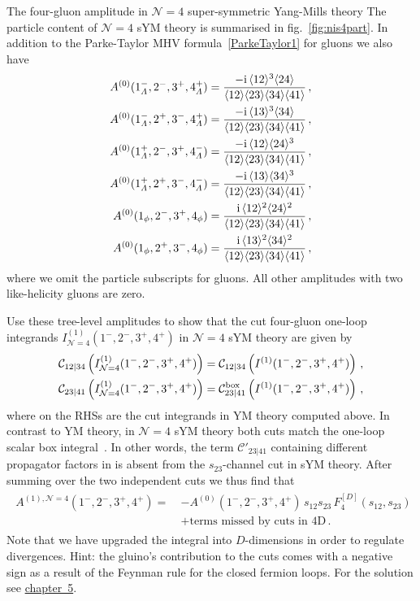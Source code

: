 \begin{exer}{The four-gluon amplitude in $\mathcal{N}=4$ super-symmetric Yang-Mills theory}
The particle content of $\mathcal{N}=4$ sYM theory is summarised in fig.~\ref{fig:nis4part}.
In addition to the Parke-Taylor MHV formula~\eqref{ParkeTaylor1} for gluons we also have
\begin{align}
\begin{aligned}
  A^{(0)}(1_\Lambda^-,2^-,3^+,4_\Lambda^+) &= \frac{-\i \, \spA12^3 \spA24}{\spA12\spA23\spA34\spA41} \,, \\
  A^{(0)}(1_\Lambda^-,2^+,3^-,4_\Lambda^+) &= \frac{-\i \, \spA13^3 \spA34}{\spA12\spA23\spA34\spA41} \,, \\
  A^{(0)}(1_\Lambda^+,2^-,3^+,4_\Lambda^-) &= \frac{-\i \, \spA12 \spA24^3}{\spA12\spA23\spA34\spA41} \,, \\
  A^{(0)}(1_\Lambda^+,2^+,3^-,4_\Lambda^-) &= \frac{-\i \, \spA13 \spA34^3}{\spA12\spA23\spA34\spA41} \,, \\
  A^{(0)}(1_\phi,2^-,3^+,4_\phi) &= \frac{\i \, \spA12^2\spA24^2}{\spA12\spA23\spA34\spA41} \,, \\
  A^{(0)}(1_\phi,2^+,3^-,4_\phi) &= \frac{\i \, \spA13^2\spA34^2}{\spA12\spA23\spA34\spA41} \,,
\end{aligned}
\end{align}
where we omit the particle subscripts for gluons.
All other amplitudes with two like-helicity gluons are zero.

Use these tree-level amplitudes to show that the cut four-gluon one-loop integrands $I^{(1)}_{\mathcal{N}=4}(1^-,2^-,3^+,4^+)$ in $\mathcal{N}=4$ sYM theory are given by
\begin{align}
  \mathcal{C}_{12|34}\left( I^{(1)}_{\mathcal{N}=4}(1^-,2^-,3^+,4^+) \right) &= \mathcal{C}_{12|34}\left( I^{(1)}(1^-,2^-,3^+,4^+) \right) \,, \\
  \mathcal{C}_{23|41}\left( I^{(1)}_{\mathcal{N}=4}(1^-,2^-,3^+,4^+) \right) &= \mathcal{C}_{23|41}^{\rm box}\left( I^{(1)}(1^-,2^-,3^+,4^+) \right) \,,
\end{align}
where on the RHSs are the cut integrands in YM theory computed above.
In contrast to YM theory, in $\mathcal{N}=4$ sYM theory both cuts match the one-loop scalar box integral~\cite{ch3_Bern:1994zx}. In other words, the term $\mathcal{C}'_{23|41}$ containing different propagator factors in  is absent from the $s_{23}$-channel cut in sYM theory. After summing over the two independent cuts we thus find that
\begin{align}
\begin{aligned}
  A^{(1),\mathcal{N}=4}(1^-,2^-,3^+,4^+) = \ & - A^{(0)}(1^-,2^-,3^+,4^+) \, s_{12} s_{23} \, F^{[D]}_4(s_{12},s_{23}) \\ &+ \text{terms missed by cuts in 4D} \,.
\end{aligned}
\end{align}
Note that we have upgraded the integral into $D$-dimensions in order to regulate divergences.
Hint: the gluino's contribution to the cuts comes with a negative sign as a result of the Feynman rule for the closed fermion loops.
For the solution see \hyperref[Sol:3.1]{chapter~5}.
\end{exer}

